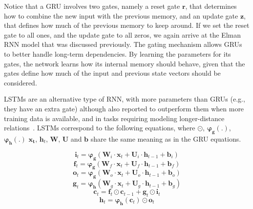 Notice that a GRU involves two gates, namely a reset gate $\mathbf{r}$, that determines how to combine the new input with the previous memory, and an update gate $\mathbf{z}$, that defines how much of the previous memory to keep around. If we set the reset gate to all ones, and the update gate to all zeros, we again arrive at the Elman RNN model that was discussed previously. The gating mechanism allows GRUs to better handle long-term dependencies. By learning the parameters for its gates, the network learns how its internal memory should behave, given that the gates define how much of the input and previous state vectors should be considered.

LSTMs are an alternative type of RNN, with more parameters than GRUs (e.g., they have an extra gate) although also reported to outperform them when more training data is available, and in tasks requiring modeling longer-distance relations~\cite{yin2017comparative}. LSTMs correspond to the following equations, where $\odot$, $\mathbf{\varphi_{g}}(.)$, $\mathbf{\varphi_{h}}(.)$ $\mathbf{x_{t}}$, $\mathbf{h}_{t}$, $\mathbf{W}$, $\mathbf{U}$ and $\mathbf{b}$ share the same meaning as in the GRU equations.

\begin{equation}
\mathbf{\mathbf{i}}_{t} = \mathbf{\varphi_{g}} \left(\mathbf{W}_i \cdot \mathbf{x}_{t} + \mathbf{U}_i \cdot \mathbf{h}_{t-1} + \mathbf{b}_{i} \right)
\end{equation}
\begin{equation}
\mathbf{f}_{t}  = \mathbf{\varphi_{g}} \left( \mathbf{W}_{f} \cdot \mathbf{x}_{t} + \mathbf{U}_{f} \cdot \mathbf{h}_{t-1} + \mathbf{b}_{f} \right)
\end{equation}
\begin{equation}
\mathbf{\mathbf{o}}_{t} = \mathbf{\varphi_{g}} \left(\mathbf{W}_o \cdot \mathbf{x}_{t} + \mathbf{U}_o \cdot \mathbf{h}_{t-1} + \mathbf{b}_{o} \right)
\end{equation}
\begin{equation}
\mathbf{\mathbf{g}}_{t} = \mathbf{\varphi_{h}} \left(\mathbf{W}_g \cdot \mathbf{x}_{t} + \mathbf{U}_g \cdot \mathbf{h}_{t-1} + \mathbf{b}_{g} \right)
\end{equation}
\begin{equation}
\mathbf{c}_{t} = \mathbf{\mathbf{f}}_{t} \odot \mathbf{c}_{t-1} + \mathbf{\mathbf{g}}_{t} \odot \mathbf{i}_{t}
\end{equation}
\begin{equation}
\mathbf{\mathbf{h}}_{t} = \mathbf{\varphi_{h}}(\mathbf{c}_{t}) \odot \mathbf{\mathbf{o}}_{t}
\end{equation}

